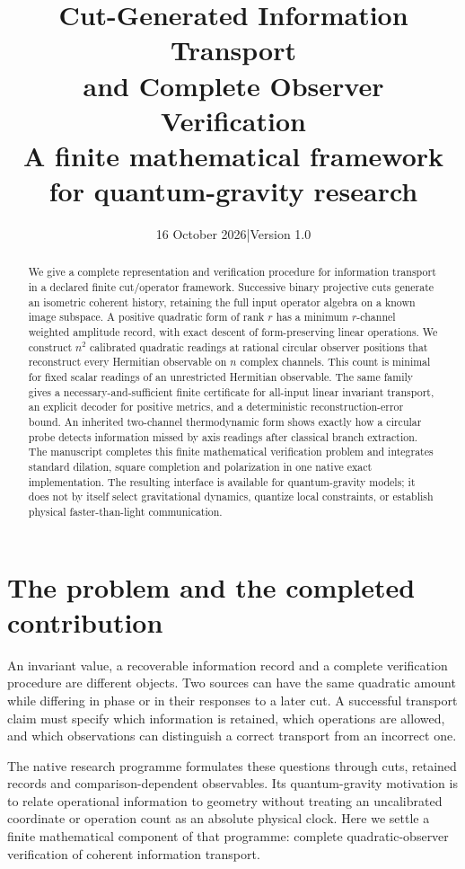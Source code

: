 \documentclass[11pt,a4paper]{article}
\title{\bfseries Cut-Generated Information Transport\\and Complete Observer Verification\\[5pt]\large A finite mathematical framework for quantum-gravity research}
\author{}
\date{16 October 2026\quad |\quad Version 1.0}
\begin{document}
\maketitle
\thispagestyle{empty}
\begin{abstract}
We give a complete representation and verification procedure for information
transport in a declared finite cut/operator framework. Successive binary
projective cuts generate an isometric coherent history, retaining the full
input operator algebra on a known image subspace. A positive quadratic form
of rank $r$ has a minimum $r$-channel weighted amplitude record, with exact
descent of form-preserving linear operations. We construct $n^2$ calibrated
quadratic readings at rational circular observer positions that reconstruct
every Hermitian observable on $n$ complex channels. This count is minimal
for fixed scalar readings of an unrestricted Hermitian observable. The same
family gives a necessary-and-sufficient finite certificate for all-input
linear invariant transport, an explicit decoder for positive metrics, and
a deterministic reconstruction-error bound. An inherited two-channel
thermodynamic form shows exactly how a circular probe detects information
missed by axis readings after classical branch extraction. The manuscript
completes this finite mathematical verification problem and integrates
standard dilation, square completion and polarization in one native exact
implementation. The resulting interface is available for quantum-gravity
models; it does not by itself select gravitational dynamics, quantize local
constraints, or establish physical faster-than-light communication.
\end{abstract}

\section{The problem and the completed contribution}

An invariant value, a recoverable information record and a complete
verification procedure are different objects. Two sources can have the same
quadratic amount while differing in phase or in their responses to a later
cut. A successful transport claim must specify which information is retained,
which operations are allowed, and which observations can distinguish a
correct transport from an incorrect one.

The native research programme formulates these questions through cuts,
retained records and comparison-dependent observables. Its quantum-gravity
motivation is to relate operational information to geometry without treating
an uncalibrated coordinate or operation count as an absolute physical clock.
Here we settle a finite mathematical component of that programme: complete
quadratic-observer verification of coherent information transport.
\end{document}
